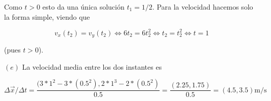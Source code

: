 \documentclass[12pt]{article}
\theoremstyle{definition}
\begin{document}
Como $t > 0$ esto da una única solución $t_1 = 1 / 2$. Para la velocidad hacemos
solo la forma simple, viendo que 

\begin{equation*}
    v_x(t_2) = v_y(t_2) \iff 6t_2 = 6t_2^2 \iff t_2 = t_2^2 \iff t = 1
\end{equation*}

(pues $t > 0$).  

$(e)$ La velocidad media entre los dos instantes es 


\begin{equation*}
    \Delta \vec{x} / \Delta t = \frac{(3 * 1^2 - 3*( 0.5^2 ), 2*1^3 -
    2*(0.5^2)}{0.5} = \frac{(2.25, 1.75)}{0.5} = (4.5, 3.5)\text{m/s}
\end{equation*}
\end{document}
